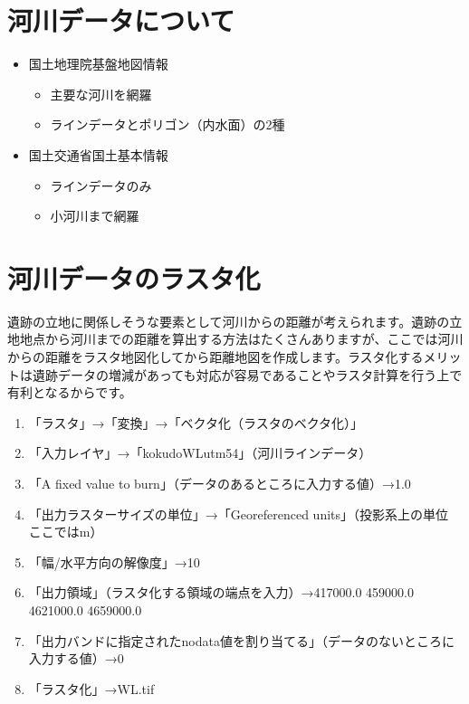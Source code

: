 \documentclass[14Q,twocolumn]{jsarticle}
\begin{document}
\section{河川データについて}
\begin{itemize}
\item 国土地理院基盤地図情報
	\begin{itemize}
	\item 主要な河川を網羅
	\item ラインデータとポリゴン（内水面）の2種
	\end{itemize}
\item 国土交通省国土基本情報
	\begin{itemize}
	\item ラインデータのみ
	\item 小河川まで網羅
	\end{itemize}
\end{itemize}

\section{河川データのラスタ化}
遺跡の立地に関係しそうな要素として河川からの距離が考えられます。遺跡の立地地点から河川までの距離を算出する方法はたくさんありますが、ここでは河川からの距離をラスタ地図化してから距離地図を作成します。ラスタ化するメリットは遺跡データの増減があっても対応が容易であることやラスタ計算を行う上で有利となるからです。

\begin{enumerate}
\item 「ラスタ」→「変換」→「ベクタ化（ラスタのベクタ化）」
\item 「入力レイヤ」→「kokudoWLutm54」（河川ラインデータ）
\item 「A fixed value to burn」（データのあるところに入力する値）→1.0
\item 「出力ラスターサイズの単位」→「Georeferenced units」（投影系上の単位　ここではm）
\item 「幅/水平方向の解像度」→10
\item 「出力領域」（ラスタ化する領域の端点を入力）→417000.0 459000.0 4621000.0 4659000.0
\item 「出力バンドに指定されたnodata値を割り当てる」（データのないところに入力する値）→0
\item 「ラスタ化」→WL.tif
\end{enumerate}
\end{document}
